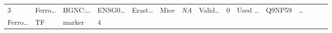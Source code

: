 \documentclass[
]{article}
\begin{document}
\begin{longtable}[]{@{}lllllllllllllll@{}}
\begin{minipage}[t]{0.02\columnwidth}
3\strut
\end{minipage} & \begin{minipage}[t]{0.05\columnwidth}\raggedright
Ferro\ldots{}\strut
\end{minipage} & \begin{minipage}[t]{0.05\columnwidth}\raggedright
HGNC:\ldots{}\strut
\end{minipage} & \begin{minipage}[t]{0.05\columnwidth}\raggedright
ENSG0\ldots{}\strut
\end{minipage} & \begin{minipage}[t]{0.05\columnwidth}\raggedright
Erast\ldots{}\strut
\end{minipage} & \begin{minipage}[t]{0.04\columnwidth}\raggedright
Mice\strut
\end{minipage} & \begin{minipage}[t]{0.05\columnwidth}\raggedright
\emph{NA}\strut
\end{minipage} & \begin{minipage}[t]{0.05\columnwidth}\raggedright
Valid\ldots{}\strut
\end{minipage} & \begin{minipage}[t]{0.05\columnwidth}\raggedright
0\strut
\end{minipage} & \begin{minipage}[t]{0.05\columnwidth}\raggedright
Used \ldots{}\strut
\end{minipage} & \begin{minipage}[t]{0.05\columnwidth}\raggedright
Q9NP59\strut
\end{minipage} & \begin{minipage}[t]{0.02\columnwidth}\raggedright
\ldots{}\strut
\end{minipage}\tabularnewline
\begin{minipage}[t]{0.05\columnwidth}\raggedright
Ferro\ldots{}\strut
\end{minipage} & \begin{minipage}[t]{0.04\columnwidth}\raggedright
TF\strut
\end{minipage} & \begin{minipage}[t]{0.04\columnwidth}\raggedright
marker\strut
\end{minipage} & \begin{minipage}[t]{0.02\columnwidth}\raggedright
4\strut
\end{minipage} & \begin{minipage}[t]{0.05\columnwidth}\raggedright

\end{minipage}
\end{longtable}
\end{document}
